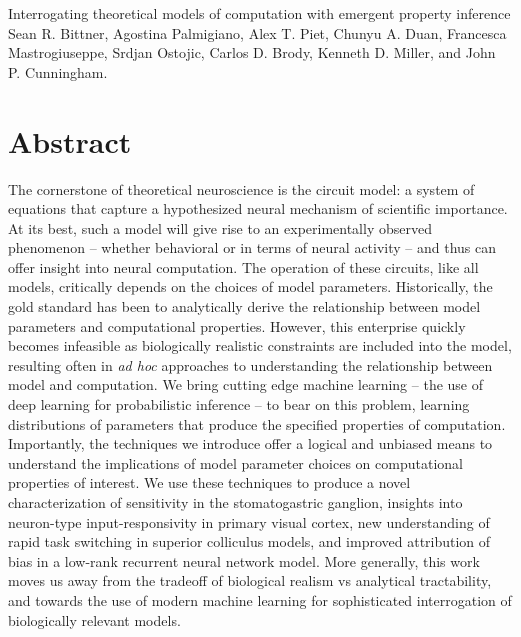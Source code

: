 \documentclass[11pt]{article}
\begin{document}
\medskip                        %

\thispagestyle{plain}
{\Large Interrogating theoretical models of computation with emergent property inference} \\
Sean R. Bittner, Agostina Palmigiano, Alex T. Piet, Chunyu A. Duan, Francesca Mastrogiuseppe, Srdjan Ostojic, Carlos D. Brody, Kenneth D. Miller, and John P. Cunningham.

\linenumbers
\section{Abstract}
The cornerstone of theoretical neuroscience is the circuit model: a system of equations that capture a hypothesized neural mechanism of scientific importance.  
At its best, such a model will give rise to an experimentally observed phenomenon -- whether behavioral or in terms of neural activity -- and thus can offer insight into neural computation.  
The operation of these circuits, like all models, critically depends on the choices of model parameters.  
Historically, the gold standard has been to analytically derive the relationship between model parameters and computational properties.  
However, this enterprise quickly becomes infeasible as biologically realistic constraints are included into the model, resulting often in \emph{ad hoc} approaches to understanding the relationship between model and computation.  
We bring cutting edge machine learning -- the use of deep learning for probabilistic inference -- to bear on this problem, learning distributions of parameters that produce the specified properties of computation.   
Importantly, the techniques we introduce offer a logical and unbiased means to understand the implications of model parameter choices on computational properties of interest.  
We use these techniques to produce a novel characterization of sensitivity in the stomatogastric ganglion, insights into neuron-type input-responsivity in primary visual cortex, new understanding of rapid task switching in superior colliculus models, and improved attribution of bias in a low-rank recurrent neural network model. 
More generally, this work moves us away from the tradeoff of biological realism vs analytical tractability, and towards the use of modern machine learning for sophisticated interrogation of biologically relevant models.
\end{document}
